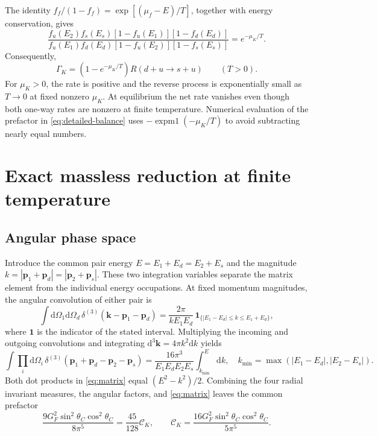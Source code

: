 \documentclass[11pt,letterpaper]{article}
\numberwithin{equation}{section}
\newcommand{\dd}{\mathrm d}
\newcommand{\CK}{\mathcal C_K}
\begin{document}
The identity \(f_f/(1-f_f)=\exp[(\mu_f-E)/T]\), together with energy conservation, gives
\begin{equation}
 \frac{f_u(E_2)f_s(E_s)[1-f_u(E_1)][1-f_d(E_d)]}
 {f_u(E_1)f_d(E_d)[1-f_u(E_2)][1-f_s(E_s)]}
 =e^{-\mu_K/T}.
 \label{eq:balance-ratio}
\end{equation}
Consequently,
\begin{equation}
 \Gamma_K=(1-e^{-\mu_K/T})R(d+u\to s+u)
 \qquad (T>0).
 \label{eq:detailed-balance}
\end{equation}
For \(\mu_K>0\), the rate is positive and the reverse process is exponentially small as \(T\to0\) at fixed nonzero \(\mu_K\).
At equilibrium the net rate vanishes even though both one-way rates are nonzero at finite temperature.
Numerical evaluation of the prefactor in \cref{eq:detailed-balance} uses \(-\operatorname{expm1}(-\mu_K/T)\) to avoid subtracting nearly equal numbers.

\section{Exact massless reduction at finite temperature}
\label{sec:reduction}
\subsection{Angular phase space}
Introduce the common pair energy \(E=E_1+E_d=E_2+E_s\) and the magnitude \(k=|\bm p_1+\bm p_d|=|\bm p_2+\bm p_s|\).
These two integration variables separate the matrix element from the individual energy occupations.
At fixed momentum magnitudes, the angular convolution of either pair is
\begin{equation}
 \int\dd\Omega_1\dd\Omega_d\,
 \delta^{(3)}(\bm k-\bm p_1-\bm p_d)
 =\frac{2\pi}{kE_1E_d}\,
 \boldsymbol 1_{\{|E_1-E_d|\leq k\leq E_1+E_d\}},
 \label{eq:pair-angle}
\end{equation}
where \(\boldsymbol 1\) is the indicator of the stated interval.
Multiplying the incoming and outgoing convolutions and integrating \(\dd^3\bm k=4\pi k^2\dd k\) yields
\begin{equation}
 \int\prod_i\dd\Omega_i\,
 \delta^{(3)}(\bm p_1+\bm p_d-\bm p_2-\bm p_s)
 =\frac{16\pi^3}{E_1E_dE_2E_s}
 \int_{k_{\min}}^E\dd k,
 \quad
 k_{\min}=\max(|E_1-E_d|,|E_2-E_s|).
 \label{eq:angular}
\end{equation}
Both dot products in \cref{eq:matrix} equal \((E^2-k^2)/2\).
Combining the four radial invariant measures, the angular factors, and \cref{eq:matrix} leaves the common prefactor
\begin{equation}
 \frac{9G_F^2\sin^2\theta_C\cos^2\theta_C}{8\pi^5}
 =\frac{45}{128}\CK,
 \qquad
 \CK=\frac{16G_F^2\sin^2\theta_C\cos^2\theta_C}{5\pi^5}.
 \label{eq:prefactor}
\end{equation}
\end{document}
